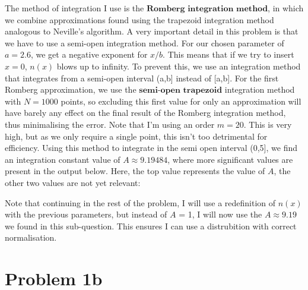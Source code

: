 The method of integration I use is the $\textbf{Romberg integration method}$, in which we combine approximations found using the trapezoid integration method analogous to Neville's algorithm. A very important detail in this problem is that we have to use a semi-open integration method. For our chosen parameter of $a = 2.6$, we get a negative exponent for $x/b$. This means that if we try to insert $x = 0$, $n(x)$ blows up to infinity. To prevent this, we use an integration method that integrates from a semi-open interval (a,b] instead of [a,b]. For the first Romberg approximation, we use the $\textbf{semi-open trapezoid}$ integration method with $N =1000$ points, so excluding this first value for only an approximation will have barely any effect on the final result of the Romberg integration method, thus minimalising the error. Note that I'm using an order $m=20$. This is very high, but as we only require a single point, this isn't too detrimental for efficiency. Using this method to integrate in the semi open interval (0,5], we find an integration constant value of $A \approx 9.19484$, where more significant values are present in the output below. Here, the top value represents the value of $A$, the other two values are not yet relevant: 



Note that continuing in the rest of the problem, I will use a redefinition of $n(x)$ with the previous parameters, but instead of $A$ = 1, I will now use the $A \approx 9.19$ we found in this sub-question. This ensures I can use a distrubition with correct normalisation. 

\section*{Problem 1b}

